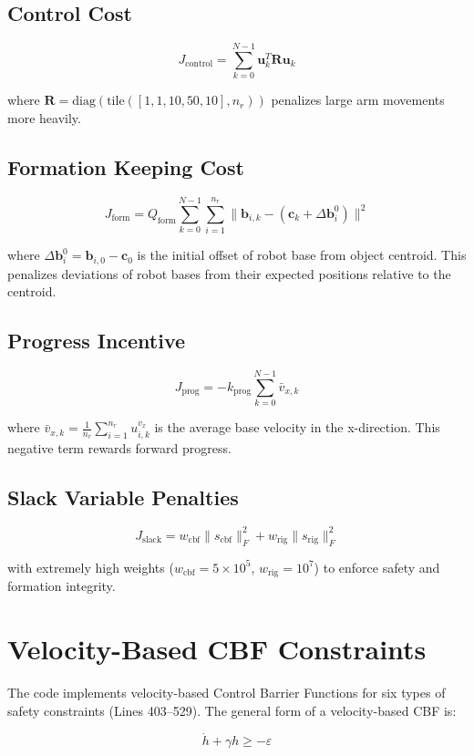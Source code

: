 \documentclass[12pt,a4paper]{article}
\begin{document}
\subsection{Control Cost}
\[
J_{\text{control}} = \sum_{k=0}^{N-1} \mathbf{u}_k^T \mathbf{R} \mathbf{u}_k
\]

where $\mathbf{R} = \text{diag}(\text{tile}([1, 1, 10, 50, 10], n_r))$ penalizes large arm movements more heavily.

\subsection{Formation Keeping Cost}
\[
J_{\text{form}} = Q_{\text{form}} \sum_{k=0}^{N-1} \sum_{i=1}^{n_r} \|\mathbf{b}_{i,k} - (\mathbf{c}_k + \Delta\mathbf{b}_i^0)\|^2
\]

where $\Delta\mathbf{b}_i^0 = \mathbf{b}_{i,0} - \mathbf{c}_0$ is the initial offset of robot base from object centroid. This penalizes deviations of robot bases from their expected positions relative to the centroid.

\subsection{Progress Incentive}
\[
J_{\text{prog}} = -k_{\text{prog}} \sum_{k=0}^{N-1} \bar{v}_{x,k}
\]

where $\bar{v}_{x,k} = \frac{1}{n_r}\sum_{i=1}^{n_r} u_{i,k}^{v_x}$ is the average base velocity in the x-direction. This negative term rewards forward progress.

\subsection{Slack Variable Penalties}
\[
J_{\text{slack}} = w_{\text{cbf}} \|s_{\text{cbf}}\|_F^2 + w_{\text{rig}} \|s_{\text{rig}}\|_F^2
\]

with extremely high weights ($w_{\text{cbf}} = 5 \times 10^5$, $w_{\text{rig}} = 10^7$) to enforce safety and formation integrity.

\section{Velocity-Based CBF Constraints}

The code implements velocity-based Control Barrier Functions for six types of safety constraints (Lines 403--529). The general form of a velocity-based CBF is:

\[
\dot{h} + \gamma h \geq -\varepsilon
\]
\end{document}
